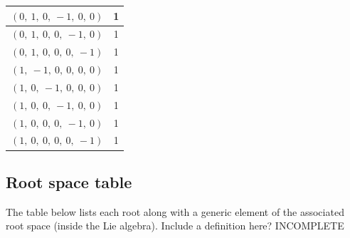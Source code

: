 \documentclass[11pt]{article}
\newcommand{\noi}{\noindent}
\theoremstyle{definition}
\begin{document}
\begin{tabular}{|l|c|}
    \hline
    $\left( 0, \  1, \  0, \  -1, \  0, \  0\right)$ & 1 \\
    \hline
    $\left( 0, \  1, \  0, \  0, \  -1, \  0\right)$ & 1 \\
    \hline
    $\left( 0, \  1, \  0, \  0, \  0, \  -1\right)$ & 1 \\
    \hline
    $\left( 1, \  -1, \  0, \  0, \  0, \  0\right)$ & 1 \\
    \hline
    $\left( 1, \  0, \  -1, \  0, \  0, \  0\right)$ & 1 \\
    \hline
    $\left( 1, \  0, \  0, \  -1, \  0, \  0\right)$ & 1 \\
    \hline
    $\left( 1, \  0, \  0, \  0, \  -1, \  0\right)$ & 1 \\
    \hline
    $\left( 1, \  0, \  0, \  0, \  0, \  -1\right)$ & 1 \\
    \hline
\end{tabular}


\subsection{Root space table}

\noi The table below lists each root along with a generic element of the associated root space (inside the Lie algebra). Include a definition here? INCOMPLETE

\bigskip
\end{document}
